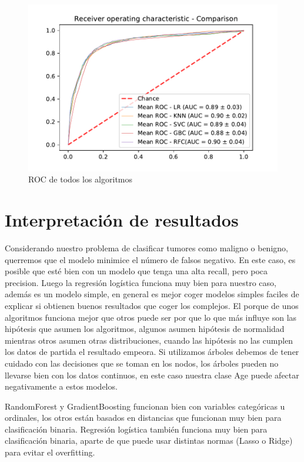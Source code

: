 \documentclass[12pt,twoside]{report}
\begin{document}
 \begin{figure}[ht]
\includegraphics[width=\textwidth]{./code/figures_python/comparison/roc.pdf}%
 \caption{ROC de todos los algoritmos}
  \label{comp:roc}
 \end{figure}
 
\chapter*{Interpretación de resultados}

Considerando nuestro problema de clasificar tumores como maligno o benigno, querremos que el modelo minimice el número de falsos negativo. En este caso, es posible que esté bien con un modelo que tenga una alta recall, pero poca precision. Luego la regresión logística funciona muy bien para nuestro caso, además es un modelo simple, en general es mejor coger modelos simples faciles de explicar si obtienen buenos resultados que coger los complejos. El porque de unos algoritmos funciona mejor que otros puede ser por que lo que más influye son las hipótesis que asumen los algoritmos, algunos asumen hipótesis de normalidad mientras otros asumen otras distribuciones, cuando las hipótesis no las cumplen los datos de partida el resultado empeora. Si utilizamos árboles debemos de tener cuidado con las decisiones que se toman en los nodos, los árboles pueden no llevarse bien con los datos continuos, en este caso nuestra clase Age puede afectar negativamente a estos modelos.

RandomForest y GradientBoosting funcionan bien con variables categóricas u ordinales, los otros están basados en distancias que funcionan muy bien para clasificación binaria. Regresión logística también funciona muy bien para clasificación binaria, aparte de que puede usar distintas normas (Lasso o Ridge) para evitar el overfitting.

\medskip

\printbibliography[
heading=bibintoc,
title={Referencias}
]
\end{document}
